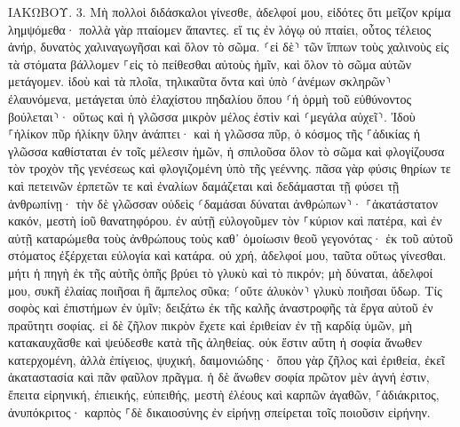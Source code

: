 \documentclass[twoside, 9pt]{extreport}
\begin{document}
ΙΑΚΩΒΟΥ.
3.
Μὴ πολλοὶ διδάσκαλοι γίνεσθε, ἀδελφοί μου, εἰδότες ὅτι μεῖζον κρίμα λημψόμεθα· 
πολλὰ γὰρ πταίομεν ἅπαντες. εἴ τις ἐν λόγῳ οὐ πταίει, οὗτος τέλειος ἀνήρ, δυνατὸς χαλιναγωγῆσαι καὶ ὅλον τὸ σῶμα. 
⸂εἰ δὲ⸃ τῶν ἵππων τοὺς χαλινοὺς εἰς τὰ στόματα βάλλομεν ⸀εἰς τὸ πείθεσθαι αὐτοὺς ἡμῖν, καὶ ὅλον τὸ σῶμα αὐτῶν μετάγομεν. 
ἰδοὺ καὶ τὰ πλοῖα, τηλικαῦτα ὄντα καὶ ὑπὸ ⸂ἀνέμων σκληρῶν⸃ ἐλαυνόμενα, μετάγεται ὑπὸ ἐλαχίστου πηδαλίου ὅπου ⸂ἡ ὁρμὴ τοῦ εὐθύνοντος βούλεται⸃· 
οὕτως καὶ ἡ γλῶσσα μικρὸν μέλος ἐστὶν καὶ ⸂μεγάλα αὐχεῖ⸃. Ἰδοὺ ⸀ἡλίκον πῦρ ἡλίκην ὕλην ἀνάπτει· 
καὶ ἡ γλῶσσα πῦρ, ὁ κόσμος τῆς ⸀ἀδικίας ἡ γλῶσσα καθίσταται ἐν τοῖς μέλεσιν ἡμῶν, ἡ σπιλοῦσα ὅλον τὸ σῶμα καὶ φλογίζουσα τὸν τροχὸν τῆς γενέσεως καὶ φλογιζομένη ὑπὸ τῆς γεέννης. 
πᾶσα γὰρ φύσις θηρίων τε καὶ πετεινῶν ἑρπετῶν τε καὶ ἐναλίων δαμάζεται καὶ δεδάμασται τῇ φύσει τῇ ἀνθρωπίνῃ· 
τὴν δὲ γλῶσσαν οὐδεὶς ⸂δαμάσαι δύναται ἀνθρώπων⸃· ⸀ἀκατάστατον κακόν, μεστὴ ἰοῦ θανατηφόρου. 
ἐν αὐτῇ εὐλογοῦμεν τὸν ⸀κύριον καὶ πατέρα, καὶ ἐν αὐτῇ καταρώμεθα τοὺς ἀνθρώπους τοὺς καθ᾽ ὁμοίωσιν θεοῦ γεγονότας· 
ἐκ τοῦ αὐτοῦ στόματος ἐξέρχεται εὐλογία καὶ κατάρα. οὐ χρή, ἀδελφοί μου, ταῦτα οὕτως γίνεσθαι. 
μήτι ἡ πηγὴ ἐκ τῆς αὐτῆς ὀπῆς βρύει τὸ γλυκὺ καὶ τὸ πικρόν; 
μὴ δύναται, ἀδελφοί μου, συκῆ ἐλαίας ποιῆσαι ἢ ἄμπελος σῦκα; ⸂οὔτε ἁλυκὸν⸃ γλυκὺ ποιῆσαι ὕδωρ. 
Τίς σοφὸς καὶ ἐπιστήμων ἐν ὑμῖν; δειξάτω ἐκ τῆς καλῆς ἀναστροφῆς τὰ ἔργα αὐτοῦ ἐν πραΰτητι σοφίας. 
εἰ δὲ ζῆλον πικρὸν ἔχετε καὶ ἐριθείαν ἐν τῇ καρδίᾳ ὑμῶν, μὴ κατακαυχᾶσθε καὶ ψεύδεσθε κατὰ τῆς ἀληθείας. 
οὐκ ἔστιν αὕτη ἡ σοφία ἄνωθεν κατερχομένη, ἀλλὰ ἐπίγειος, ψυχική, δαιμονιώδης· 
ὅπου γὰρ ζῆλος καὶ ἐριθεία, ἐκεῖ ἀκαταστασία καὶ πᾶν φαῦλον πρᾶγμα. 
ἡ δὲ ἄνωθεν σοφία πρῶτον μὲν ἁγνή ἐστιν, ἔπειτα εἰρηνική, ἐπιεικής, εὐπειθής, μεστὴ ἐλέους καὶ καρπῶν ἀγαθῶν, ⸀ἀδιάκριτος, ἀνυπόκριτος· 
καρπὸς ⸀δὲ δικαιοσύνης ἐν εἰρήνῃ σπείρεται τοῖς ποιοῦσιν εἰρήνην. 
\end{document}
